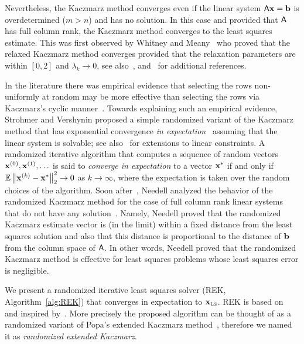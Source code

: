 %

Nevertheless, the Kaczmarz method converges even if the linear system ${\mathsf{A} }\mathbf{x} = {\mathbf b}$ is overdetermined ($m>n$) and has no solution. In this case and provided that ${\mathsf{A} }$ has full column rank, the Kaczmarz method converges to the least squares estimate. This was first observed by Whitney and Meany~\cite{K:rate:WM67} who proved that the relaxed Kaczmarz method converges provided that the relaxation parameters are within $[0,2]$ and $\lambda_k\to 0$, see also~\cite[Theorem~1]{K:relax:CEG83}, \cite{K:Tanabe} and~\cite{K:relax:Hanke90} for additional references.

In the literature there was empirical evidence that selecting the rows non-uniformly at random may be more effective than selecting the rows via Kaczmarz's cyclic manner~\cite{RK:HM93,K:apps:CFM92}. Towards explaining such an empirical evidence, Strohmer and Vershynin proposed a simple randomized variant of the Kaczmarz method that has exponential convergence \emph{in expectation}~\cite{RK} assuming that the linear system is solvable; see also~\cite{LS:RCD} for extensions to linear constraints. A randomized iterative algorithm that computes a sequence of random vectors $\mathbf{x}^{(0)}, \mathbf{x}^{(1)}, \ldots$ is said to \emph{converge in expectation} to a vector $\mathbf{x}^*$ if and only if $\operatorname{\mathbb{E}} \left\|\mathbf{x}^{(k)} - \mathbf{x}^*\right\|_2^2\to 0$ as $k\to\infty$, where the expectation is taken over the random choices of the algorithm. Soon after~\cite{RK}, Needell analyzed the behavior of the randomized Kaczmarz method for the case of full column rank linear systems that do not have any solution~\cite{Needell09}. Namely, Needell proved that the randomized Kaczmarz estimate vector is (in the limit) within a fixed distance from the least squares solution and also that this distance is proportional to the distance of ${\mathbf b}$ from the column space of ${\mathsf{A} }$. In other words, Needell proved that the randomized Kaczmarz method is effective for least squares problems whose least squares error is negligible.

We present a randomized iterative least squares solver (REK, Algorithm~\ref{alg:REK}) that converges in expectation to $\mathbf{x}_{\textrm{\tiny LS}}$. REK is based on~\cite{RK,Needell09} and inspired by~\cite{popa}. More precisely the proposed algorithm can be thought of as a randomized variant of Popa's extended Kaczmarz method~\cite{popa}, therefore we named it as \emph{randomized extended Kaczmarz}.

